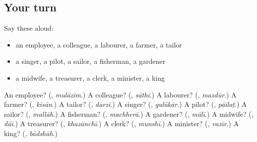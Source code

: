 \subsection*{Your turn}
Say these aloud:

\begin{itemize}
\raggedright
  \item an employee, a colleague, a labourer, a farmer, a tailor
  \item a singer, a pilot, a sailor, a fisherman, a gardener
  \item a midwife, a treasurer, a clerk, a minister, a king
\end{itemize}

\begin{tcolorbox}[breakable,colback=teal!4,colframe=teal!35!black,title={Before you move on}]
An employee? (\textbf{}, \emph{mulāzim}.) A colleague? (\textbf{}, \emph{sāthī}.) A labourer? (\textbf{}, \emph{mazdūr}.) A farmer? (\textbf{}, \emph{kisān}.) A tailor? (\textbf{}, \emph{darzī}.) A singer? (\textbf{}, \emph{gulūkār}.) A pilot? (\textbf{}, \emph{pāilaṭ}.) A sailor? (\textbf{}, \emph{mallāh}.) A fisherman? (\textbf{}, \emph{machherā}.) A gardener? (\textbf{}, \emph{mālī}.) A midwife? (\textbf{}, \emph{dāī}.) A treasurer? (\textbf{}, \emph{khazānchī}.) A clerk? (\textbf{}, \emph{munshī}.) A minister? (\textbf{}, \emph{vazīr}.) A king? (\textbf{}, \emph{bādshāh}.)
\end{tcolorbox}
